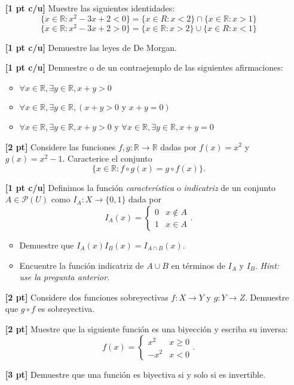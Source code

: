\documentclass[9pt]{extarticle}
\newcommand{\R}{\mathbb{R}}
\begin{document}
\begin{itemize}
    \item[\bf{[1 pt c/u]}] Muestre las siguientes identidades:
            $$ \{x\in \R: x^2 - 3x + 2 < 0 \} = \{x\in R: x< 2\} \cap \{x\in \R: x > 1\} $$
            $$\{x\in \R: x^2 - 3x+2 > 0 \} = \{x\in \R: x>2\} \cup \{x\in R: x<1\} $$

    \item [\bf{[1 pt c/u]}] Demuestre las leyes de De Morgan.

    \item[\bf{[1 pt c/u]}] Demuestre o de un contraejemplo de las siguientes afirmaciones:
        \begin{itemize}
            \item $\forall x\in \R, \exists y \in \R, x+y > 0 $
            \item $\forall x\in \R, \exists y \in \R, (x+y > 0 \text{ y } x + y = 0 )$
            \item $\forall x\in \R, \exists y \in \R, x+y > 0$ y $\forall x \in \R, \exists y \in \R,  x + y = 0$

        \end{itemize}

    \item[\bf{[2 pt]}] Considere las funciones $f,g:\R\to\R$ dadas por $f(x) = x^2$ y $g(x) = x^2-1$. Caracterice el conjunto 
        $$ \{x \in \R: f\circ g(x) = g\circ f(x) \}. $$

    \item[\bf{[1 pt c/u]}] Definimos la función \emph{característica} o \emph{indicatriz} de un conjunto $A\in \mathcal P(U)$ como $I_A:X\to \{0,1\}$ dada por
        $$ I_A(x) = \begin{cases} 0 & x\not\in A \\ 1 & x \in A\end{cases}. $$
        \begin{itemize}
            \item Demuestre que $I_A(x)I_B(x)=I_{A\cap B}(x)$.
            \item Encuentre la función indicatriz de $A\cup B$ en términos de $I_A$ y $I_B$. \emph{Hint: use la pregunta anterior}.
        \end{itemize}

    \item[\bf{[2 pt]}]  Considere dos funciones sobreyectivas $f:X\to Y$ y $g:Y\to Z$. Demuestre que $g\circ f$ es sobreyectiva. 


    \item[\bf{[2 pt]}]  Muestre que la siguiente función es una biyección y escriba su inversa: 
                $$ f(x) = \begin{cases} x^2 & x\geq 0 \\ -x^2 & x < 0 \end{cases}. $$

    \item[\bf{[3 pt]}] Demuestre que una función es biyectiva si y solo si es invertible.
\end{itemize} %

\vspace{1cm}
\end{document}

